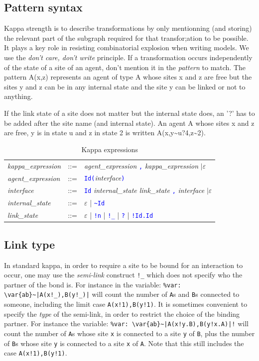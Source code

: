 \documentclass[11pt]{book}
\def\intstate{\textasciitilde}
\def\tcb#1{\textcolor{blue}{\ttt{#1}}}
\def\ttt#1{\texttt{#1}}
\def\var#1{{\textquotesingle}#1{\textquotesingle}}
\begin{document}
\subsection{Pattern syntax}
Kappa strength is to describe transformations by only mentionning (and
storing) the relevant part of the subgraph required for that
transfor;ation to be possible. It plays a key role in resisting
combinatorial explosion when writing models. We use the \emph{don't
  care, don't write} principle. If a
transformation occurs independently of the state of a site of an
agent, don't mention it in the \emph{pattern} to match. The pattern
A(x,z) represents an agent of type A whose sites x and z are free but
the sites y and z can be in any internal state and the site y can be
linked or not to anything.

If the link state of a site does not matter but the internal state
does, an '?' has to be added after the site name (and internal state).
An agent A whose sites x and z are free, y is in state u and z in
state 2 is written A(x,y\intstate{}u?4,z\intstate{}2).

\begin{table}[ht!]
  \centering
  \caption{Kappa expressions}
  \begin{tabular}{@{} lcl @{}}
    \textit{kappa\_expression} & ::= & \textit{agent\_expression} \tcb{,} \textit{kappa\_expression} $\mid\varepsilon$ \\
    \textit{agent\_expression} & ::= &  \tcb{Id}\tcb{(}\textit{interface}\tcb{)} \\
    \textit{interface} &::=& \tcb{Id} \textit{internal\_state link\_state}  \tcb{,} \textit{interface} $\mid\varepsilon$ \\
    \textit{internal\_state} &::=& $\varepsilon$ | \tcb{\intstate Id} \\
    \textit{link\_state} &::=& $\varepsilon$ | \tcb{!n} | \tcb{!\_} | \tcb{?}  | \tcb{!Id.Id} \\
    \end{tabular}
  \label{tab:patterns}
\end{table}

\subsection{Link type}

In standard kappa, in order to require a site to be bound for an
interaction to occur, one may use the
\emph{semi-link} construct \ttt{!\_} which does not
specify who the partner of the bond is. For instance in the variable:
\lstinline[language=kappa]*%var: \var{ab}~|A(x!_),B(y!_)|* will
count the number of \ttt{A}s and \ttt{B}s connected to someone,
including the limit case \ttt{A(x!1),B(y!1)}. It is sometimes
convenient to specify the \emph{type} of the
semi-link, in order to restrict the choice of the binding partner. For
instance the variable:
\lstinline[language=kappa]*%var: \var{ab}~|A(x!y.B),B(y!x.A)|!*
will count the number of \ttt{A}s whose
site \ttt{x} is connected to a site \ttt{y} of \ttt{B}, plus the
number of \ttt{B}s whose site \ttt{y} is connected to a site \ttt{x}
of \ttt{A}. Note that this still includes the case
\ttt{A(x!1),B(y!1)}.
\end{document}
